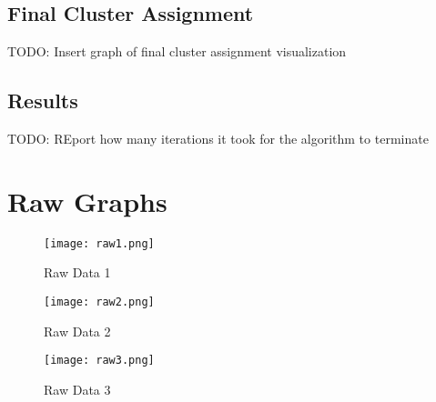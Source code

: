 \documentclass[12pt]{article}
\begin{document}
\subsection*{Final Cluster Assignment}
TODO: Insert graph of final cluster assignment visualization
\subsection*{Results}
TODO: REport how many iterations it took for the algorithm to terminate

\newpage
\section*{Raw Graphs}
\begin{figure}[H]
\begin{center}
\texttt{[image: raw1.png]}
\caption{Raw Data 1}
\label{Raw Data 1}
\end{center}
\end{figure}

\begin{figure}[H]
\begin{center}
\texttt{[image: raw2.png]}
\caption{Raw Data 2}
\label{Raw Data 2}
\end{center}
\end{figure}

\begin{figure}[H]
\begin{center}
\texttt{[image: raw3.png]}
\caption{Raw Data 3}
\label{Raw Data 3}
\end{center}
\end{figure}
\end{document}
